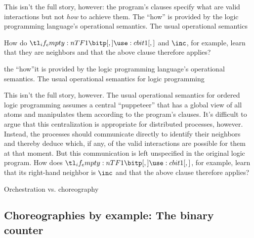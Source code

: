 This isn't the full story, however:
the program's clauses specify what are valid interactions but not \emph{how} to achieve them.
The \enquote{how} is provided by the logic programming language's operational semantics.
The usual operational semantics


How do $\bit{1}$ and $\inc$, for example, learn that they are neighbors and that the above clause therefore applies?


the \enquote{how}it is provided by the logic programming language's operational semantics.
The usual operational semantics for logic programming 

This isn't the full story, however.
The usual operational semantics for ordered logic programming assumes a central \enquote{puppeteer} that has a global view of all atoms and manipulates them according to the program's clauses.
It's difficult to argue that this centralization is appropriate for distributed processes, however.
Instead, the processes should communicate directly to identify their neighbors and thereby deduce which, if any, of the valid interactions are possible for them at that moment.
But this communication is left unspecified in the original logic program.
How does $\bit{1}$, for example, learn that its right-hand neighbor is $\inc$ and that the above clause therefore applies?


Orchestration vs. choreography


\subsection{Choreographies by example: The binary counter}\label{sec:exampl-chor-binary}

